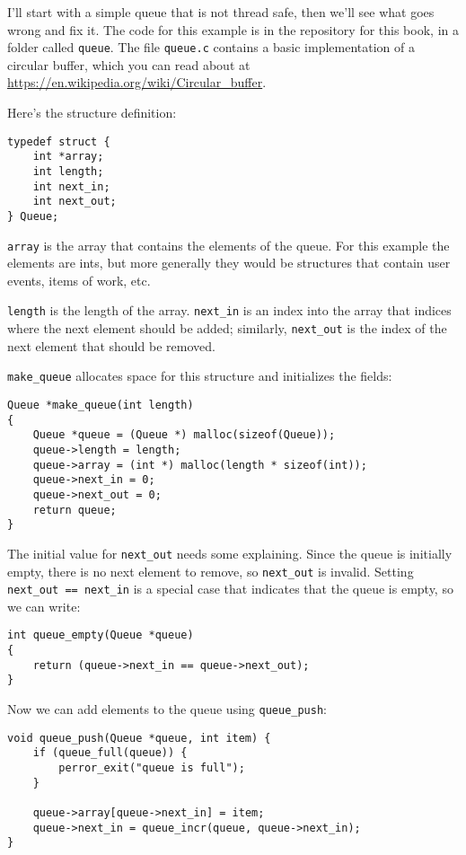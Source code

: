 \documentclass[12pt]{book}
\begin{document}
I'll start with a simple queue that is not thread safe, then we'll see
what goes wrong and fix it.  The code for this example is in the
repository for this book, in a folder called {\tt queue}.  The file
{\tt queue.c} contains a basic implementation of a circular buffer,
which you can read about at
\url{https://en.wikipedia.org/wiki/Circular_buffer}.

Here's the structure definition:

\begin{verbatim}
typedef struct {
    int *array;
    int length;
    int next_in;
    int next_out;
} Queue;
\end{verbatim}

{\tt array} is the array that contains the elements of the queue.
For this example the elements are ints, but more generally
they would be structures that contain user events, items of work, etc.

{\tt length} is the length of the array.  \verb"next_in" is an
index into the array that indices where the next element should be
added; similarly, \verb"next_out" is the index of the next element
that should be removed.

\verb"make_queue" allocates space for this structure and initializes
the fields:

\begin{verbatim}
Queue *make_queue(int length)
{
    Queue *queue = (Queue *) malloc(sizeof(Queue));
    queue->length = length;
    queue->array = (int *) malloc(length * sizeof(int));
    queue->next_in = 0;
    queue->next_out = 0;
    return queue;
}
\end{verbatim}

The initial value for \verb"next_out" needs some explaining.
Since the queue is initially empty, there is no next element to
remove, so \verb"next_out" is invalid.  Setting
\verb"next_out == next_in" is a special case that indicates
that the queue is empty, so we can write:

\begin{verbatim}
int queue_empty(Queue *queue)
{
    return (queue->next_in == queue->next_out);
}
\end{verbatim}

Now we can add elements to the queue using \verb"queue_push":

\begin{verbatim}
void queue_push(Queue *queue, int item) {
    if (queue_full(queue)) {
        perror_exit("queue is full");
    }
  
    queue->array[queue->next_in] = item;
    queue->next_in = queue_incr(queue, queue->next_in);
}
\end{verbatim}
\end{document}
